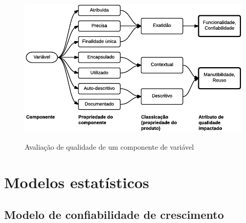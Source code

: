 \documentclass[
	12pt,				%
	openright,			%
	oneside,			%
	a4paper,			%
	english,			%
	brazil,				%
	]{abntex2}
\begin{document}
\begin{figure}[H]
    \centering
    \caption{Avaliação de qualidade de um componente de variável}
    \graphicspath{ {./graphics/} }
    \includegraphics[scale=0.85]{dromey-estrutura_modelo_exemplo-andrei}
    \label{fig:dromey-estrutura_modelo_exemplo}
\end{figure}


\section{Modelos estatísticos}
\subsection{Modelo de confiabilidade de crescimento}
\end{document}
